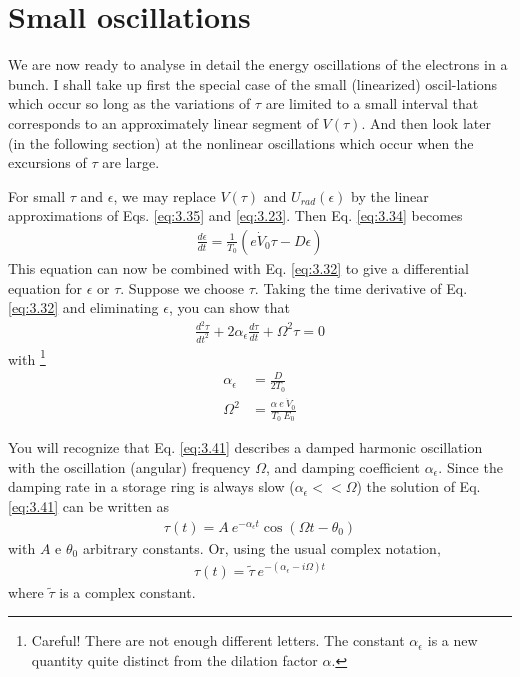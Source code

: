 \section{Small oscillations}\label{sec:3.5}
We are now ready to analyse in detail the energy oscillations of the electrons in a bunch. I shall take up first the special case of the small (linearized) oscil-lations which occur so long as the variations of $\tau$ are limited to a small interval that corresponds to an approximately linear segment of $V(\tau)$. And then look later (in the following section) at the nonlinear oscillations which occur when the excursions of $\tau$ are large.

For small $\tau$ and $\epsilon$, we may replace $V(\tau)$ and $U_{rad}(\epsilon)$ by the linear approximations of Eqs. \eqref{eq:3.35} and \eqref{eq:3.23}. Then Eq. \eqref{eq:3.34} becomes
\begin{align}
	\frac{d\epsilon}{dt} = \frac{1}{T_0}(e\dot{V}_0 \tau - D\epsilon)\label{eq:3.40}
\end{align}
This equation can now be combined with Eq. \eqref{eq:3.32} to give a differential equation for $\epsilon$ or $\tau$. Suppose we choose $\tau$. Taking the time derivative of Eq. \eqref{eq:3.32} and eliminating $\epsilon$, you can show that
\begin{align}
	\frac{d^2 \tau}{dt^2} + 2\alpha_\epsilon \frac{d\tau}{dt} + \Omega^2 \tau = 0\label{eq:3.41}
\end{align}
with \footnote{Careful! There are not enough different letters. The constant $\alpha_\epsilon$ is a new quantity quite distinct from the dilation factor $\alpha$.}
\begin{align}
	\alpha_\epsilon &= \frac{D}{2 T_0}\\
	\Omega^2 &= \frac{\alpha\ e\ \dot{V}_0}{T_0\ E_0}
\end{align}

You will recognize that Eq. \eqref{eq:3.41} describes a damped harmonic oscillation with the oscillation (angular) frequency $\Omega$, and damping coefficient $\alpha_\epsilon$. Since the damping rate in a storage ring is always slow ($\alpha_\epsilon << \Omega$) the solution of Eq. \eqref{eq:3.41} can be written as
\begin{align} \label{eq:3.44}
	\tau(t) = A\ e^{-\alpha_\epsilon t} \cos(\Omega t - \theta_0)
\end{align}
with $A$ e $\theta_0$ arbitrary constants. Or, using the usual complex notation,
\begin{align}
	\tau(t) = \tilde{\tau}\ e^{-(\alpha_\epsilon - i\Omega)t}
\end{align}
where $\tilde{\tau}$ is a complex constant.

